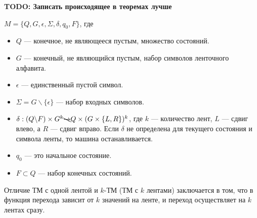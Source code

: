     
    \par \textbf{TODO: Записать происходящее в теоремах лучше}
    \begin{Def}
    $M = \{Q, G, \epsilon, \Sigma, \delta, q_0, F\}$, где
    \begin{itemize}
        \item $Q$ --- конечное, не являющееся пустым, множество состояний.
        \item $G$ --- конечный, не являющийся пустым, набор символов ленточного алфавита.
        \item $\epsilon$ --- единственный пустой символ.
        \item $\Sigma = G \backslash \{\epsilon\}$ --- набор входных символов.
        \item $\delta : (Q \backslash F) \times G^k \bcancel{\rightarrow}
        Q \times (G \times \{L, R\})^k$, где $k$ --- количество лент, $L$ --- сдвиг влево, а $R$ --- сдвиг вправо. Если $\delta$ не определена для текущего состояния и символа ленты, то машина останавливается.
        \item $q_0$ --- это начальное состояние.
        \item $F \subset {Q}$  --- набор конечных состояний.
    \end{itemize}
    \end{Def}
    \begin{Rem}
        Отличие ТМ с одной лентой и $k$-ТМ (ТМ с $k$ лентами) заключается в том, что в функция перехода зависит от $k$ значений на ленте, и переход осуществляет на $k$ лентах сразу.
    \end{Rem}


